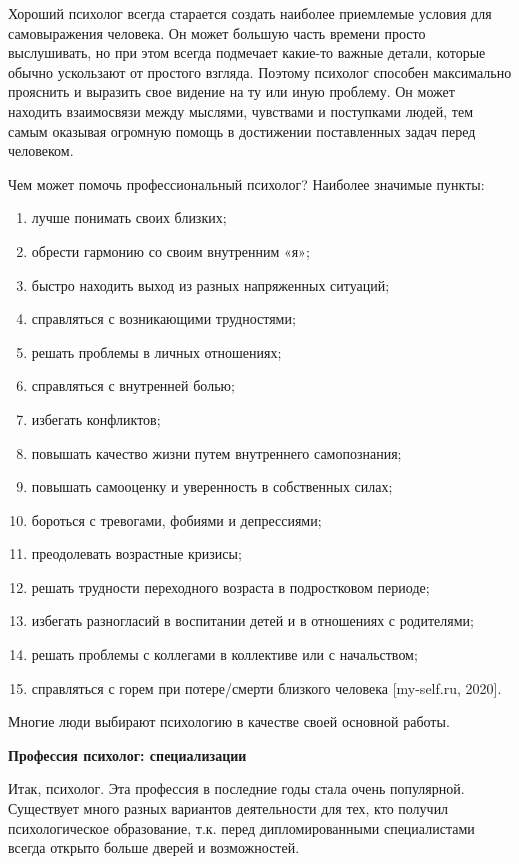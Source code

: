 Хороший психолог всегда старается создать наиболее приемлемые условия для самовыражения человека. Он может большую часть времени просто выслушивать, но при этом всегда подмечает какие-то важные детали, которые обычно ускользают от простого взгляда. Поэтому психолог способен максимально прояснить и выразить свое видение на ту или иную проблему. Он может находить взаимосвязи между мыслями, чувствами и поступками людей, тем самым оказывая огромную помощь в достижении поставленных задач перед человеком.

Чем может помочь профессиональный психолог? Наиболее значимые пункты:
\begin{enumerate}
    \item лучше понимать своих близких;
    \item обрести гармонию со своим внутренним «я»;
    \item быстро находить выход из разных напряженных ситуаций;
    \item справляться с возникающими трудностями;
    \item  решать проблемы в личных отношениях;
    \item справляться с внутренней болью;
    \item избегать конфликтов;
    \item повышать качество жизни путем внутреннего самопознания;
    \item повышать самооценку и уверенность в собственных силах;
    \item бороться с тревогами, фобиями и депрессиями;
    \item преодолевать возрастные кризисы;
    \item решать трудности переходного возраста в подростковом периоде;
    \item избегать разногласий в воспитании детей и в отношениях с родителями;
    \item решать проблемы с коллегами в коллективе или с начальством;
    \item справляться с горем при потере/смерти близкого человека [my-self.ru, 2020].
\end{enumerate}

Многие люди выбирают психологию в качестве своей основной работы.

\textbf{Профессия психолог: специализации}

Итак, психолог. Эта профессия в последние годы стала очень популярной. Существует много разных вариантов деятельности для тех, кто получил психологическое образование, т.к. перед дипломированными специалистами всегда открыто больше дверей и возможностей.

